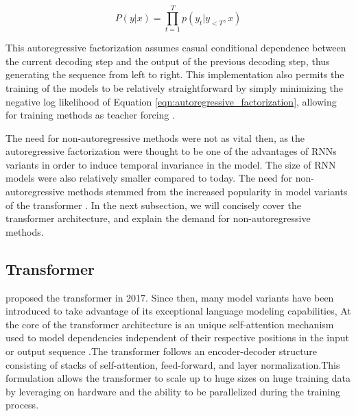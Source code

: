 \begin{equation} \label{eqn:autoregressive_factorization} P(y|x) = \prod_{t=1}^{T}p(y_t|y_{<T},x) \end{equation}

This autoregressive factorization assumes casual conditional dependence between the current decoding step and the output of the previous decoding step, thus generating the sequence from left to right. This implementation also permits the training of the models to be relatively straightforward by simply minimizing the negative log likelihood of Equation \ref{eqn:autoregressive_factorization}, allowing for training methods as teacher forcing \cite{williams_learning_1989_teacher_forcing}.

The need for non-autoregressive methods were not as vital then, as the autoregressive factorization were thought to be one of the advantages of RNNs variants in order to induce temporal invariance \cite{battaglia_relational_inductive_biases_2018} in the model. The size of RNN models were also relatively smaller compared to today. The need for non-autoregressive methods stemmed from the increased popularity in model variants of the transformer \cite{vaswani_attention_2017}. In the next subsection, we will concisely cover the transformer architecture, and explain the demand for non-autoregressive methods.


\subsection{Transformer}\label{subsec:background2}
\textcite{vaswani_attention_2017} proposed the transformer in 2017. Since then, many model variants have been introduced to take advantage of its exceptional language modeling capabilities, At the core of the transformer architecture is an unique self-attention mechanism used to model dependencies independent of their respective positions in the input or output sequence \cite{vaswani_attention_2017}.The transformer follows an encoder-decoder structure \cite{cho_learning_2014_encdec, sutskever_sequence_2014_encdec, bahdanau_neural_2016_encdec} consisting of stacks of self-attention, feed-forward, and layer normalization.This formulation allows the transformer to scale up to huge sizes on huge training data by leveraging on hardware and the ability to be parallelized during the training process. 


